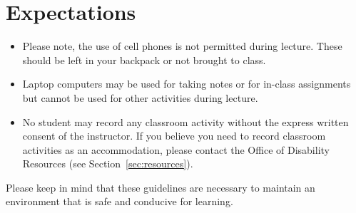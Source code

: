 
\section{Expectations}
\begin{itemize}
\item Please note, the use of cell phones is not permitted during lecture.  
These should be left in your backpack or not brought to class. 
\item Laptop computers may be used for taking notes or for in-class assignments but cannot be used for other activities during lecture.
\item No student may record any classroom activity without the express written consent of the instructor. 
If you believe you need to record classroom activities as an accommodation, 
please contact the Office of Disability Resources (see Section~\ref{sec:resources}).
 \end{itemize}
 
Please keep in mind that these guidelines are necessary to maintain an environment that is safe and conducive for learning.
 
